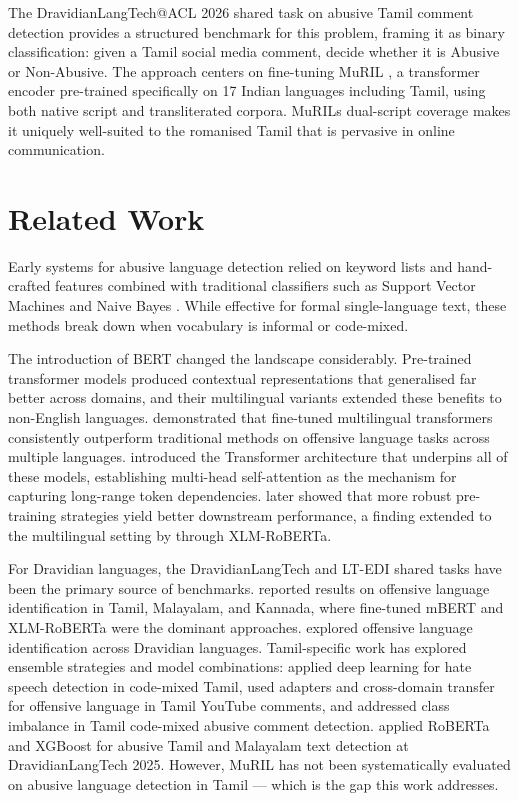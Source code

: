 \documentclass[11pt]{article}
\begin{document}
The DravidianLangTech@ACL 2026 shared task on abusive Tamil comment detection
\citep{abusive-tamil-women-dravidianlangtech-acl-2026} provides a structured benchmark
for this problem, framing it as binary classification: given a Tamil social media
comment, decide whether it is Abusive or Non-Abusive. The approach centers on
fine-tuning MuRIL \citep{khanuja2021}, a transformer encoder pre-trained specifically
on 17 Indian languages including Tamil, using both native script and transliterated
corpora. MuRIL\textquotesingle{}s dual-script coverage makes it uniquely well-suited
to the romanised Tamil that is pervasive in online communication.

\section{Related Work}

Early systems for abusive language detection relied on keyword lists and hand-crafted
features combined with traditional classifiers such as Support Vector Machines and
Naive Bayes \citep{nobata2016}. While effective for formal single-language text, these
methods break down when vocabulary is informal or code-mixed.

The introduction of BERT \citep{devlin2019} changed the landscape considerably.
Pre-trained transformer models produced contextual representations that generalised
far better across domains, and their multilingual variants extended these benefits to
non-English languages.  demonstrated that fine-tuned
multilingual transformers consistently outperform traditional methods on offensive
language tasks across multiple languages.  introduced the
Transformer architecture that underpins all of these models, establishing multi-head
self-attention as the mechanism for capturing long-range token dependencies.
 later showed that more robust pre-training strategies yield better
downstream performance, a finding extended to the multilingual setting by
 through XLM-RoBERTa.

For Dravidian languages, the DravidianLangTech and LT-EDI shared tasks have been the
primary source of benchmarks.  reported results on
offensive language identification in Tamil, Malayalam, and Kannada, where fine-tuned
mBERT and XLM-RoBERTa were the dominant approaches.  explored
offensive language identification across Dravidian languages. Tamil-specific work has
explored ensemble strategies and model combinations:  applied
deep learning for hate speech detection in code-mixed Tamil, 
used adapters and cross-domain transfer for offensive language in Tamil YouTube
comments, and  addressed class imbalance in Tamil code-mixed
abusive comment detection.  applied RoBERTa and XGBoost for
abusive Tamil and Malayalam text detection at DravidianLangTech 2025. However, MuRIL
has not been systematically evaluated on abusive language detection in Tamil ---
which is the gap this work addresses.
\end{document}
